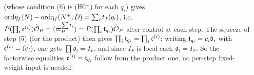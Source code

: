 \begin{remark}[the case $r=3$: which quotients must be Gorenstein]
\begin{enumerate}[label=(\alph*)]
  (whose condition (6) is (H0$^-$) for each $q_i$) gives $\mathrm{ord}\eta_f(N)-\mathrm{ord}\eta_f(N^+,D)=\sum_it_f(q_i)$, i.e.\
  $P(\prod_i\mathfrak{c}^{(i)})\widetilde{\mathcal{O}}_P=(\varpi_P^{\sum t_i})=P(\prod_i\mathfrak{t}_{q_i})\widetilde{\mathcal{O}}_P$ after control at each step. The squeeze of step (5) (for the
  product) then gives $\prod_i\mathfrak{t}_{q_i}=\prod_i\mathfrak{c}^{(i)}$; writing $\mathfrak{t}_{q_i}=c_i\mathfrak d_i$ with $\mathfrak{c}^{(i)}=(c_i)$, one gets $\prod\mathfrak d_i=I_F$, and since
  $I_F$ is local each $\mathfrak d_i=I_F$. So the factorwise equalities $\mathfrak{c}^{(i)}=\mathfrak{t}_{q_i}$ follow from the product one; no per-step
  fixed-weight input is needed. \stsketch
\end{enumerate}
\end{remark}
